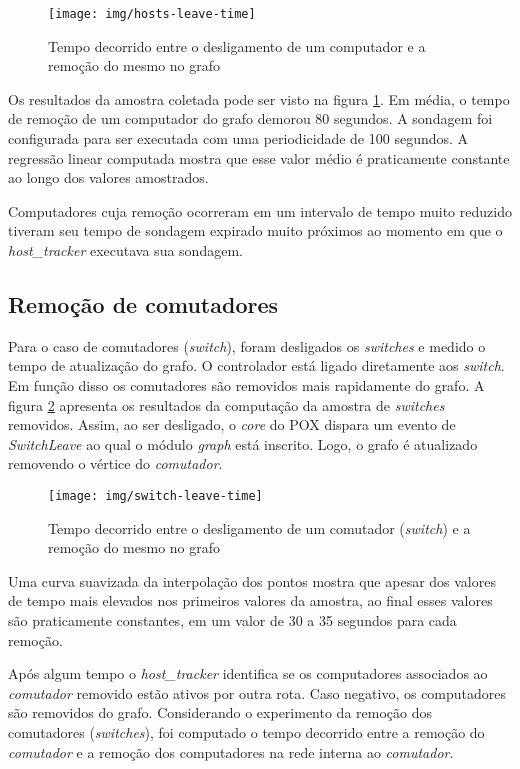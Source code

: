 \begin{figure}[h!]
    \centering
    \label{fig:hosts-leave-time}
    \texttt{[image: img/hosts-leave-time]}
    \caption{Tempo decorrido entre o desligamento de um computador e a
    remoção do mesmo no grafo}
\end{figure}

Os resultados da amostra coletada pode ser visto na figura
\ref{fig:hosts-leave-time}.
Em média, o tempo de remoção de um computador do grafo demorou 80 segundos.
A sondagem foi configurada para ser executada com uma periodicidade de 100
segundos.
A regressão linear computada mostra que esse valor médio é praticamente
constante ao longo dos valores amostrados.

Computadores cuja remoção ocorreram em um intervalo de tempo muito reduzido
tiveram seu tempo de sondagem expirado muito próximos ao momento em que
o \emph{host\_tracker} executava sua sondagem.

\subsection{Remoção de comutadores}

Para o caso de comutadores (\emph{switch}), foram desligados os 
\emph{switches} e medido o tempo de atualização do grafo.
O controlador está ligado diretamente aos \emph{switch}. 
Em função disso os comutadores são removidos mais rapidamente do grafo.
A figura \ref{fig:switch-leave-time} apresenta os resultados da 
computação da amostra de \emph{switches} removidos.
Assim, ao ser desligado, o \emph{core} do POX dispara um evento 
de \emph{SwitchLeave} ao qual o módulo \emph{graph} está inscrito. 
Logo, o grafo é atualizado removendo o vértice do \emph{comutador}.

\begin{figure}[h!]
    \centering
    \label{fig:switch-leave-time}
    \texttt{[image: img/switch-leave-time]}
    \caption{Tempo decorrido entre o desligamento de um comutador 
    (\emph{switch}) e a remoção do mesmo no grafo}
\end{figure}

Uma curva suavizada da interpolação dos pontos mostra que apesar dos valores
de tempo mais elevados nos primeiros valores da amostra, ao final esses valores
são praticamente constantes, em um valor de 30 a 35 segundos para cada 
remoção.

Após algum tempo o \emph{host\_tracker} identifica se os computadores 
associados ao \emph{comutador} removido estão ativos por outra rota. 
Caso negativo, os computadores são removidos do grafo.
Considerando o experimento da remoção dos comutadores (\emph{switches}),
foi computado o tempo decorrido entre a remoção do \emph{comutador} e a 
remoção dos computadores na rede interna ao \emph{comutador}. 

